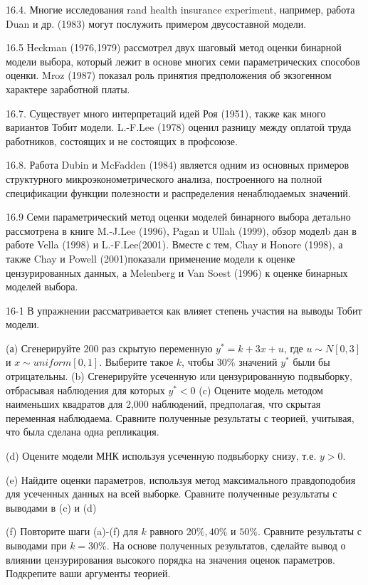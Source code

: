 16.4. Многие исследования rand health insurance experiment, например, работа Duan и др. (1983) могут послужить примером двусоставной модели.

16.5 Heckman (1976,1979) рассмотрел двух шаговый метод оценки бинарной модели выбора, который лежит в основе многих семи параметрических способов оценки. Mroz (1987) показал роль принятия предположения об экзогенном характере заработной платы.

16.7. Существует много интерпретаций идей Роя (1951), также как много вариантов Тобит модели. L.-F.Lee (1978) оценил разницу между оплатой труда работников, состоящих и не состоящих в профсоюзе.

16.8. Работа Dubin и McFadden (1984) является одним из основных примеров структурного микроэконометрического анализа, построенного на полной спецификации функции полезности и распределения ненаблюдаемых значений.

16.9 Семи параметрический метод оценки моделей бинарного выбора детально рассмотрена в книге M.-J.Lee (1996), Pagan и Ullah (1999), обзор моделb дан в работе Vella (1998) и L.-F.Lee(2001). Вместе с тем, Chay и Honore (1998), а также Chay и Powell (2001)показали применение модели к оценке цензурированных данных, а Melenberg и Van Soest (1996) к оценке бинарных моделей выбора. 

16-1 В упражнении рассматривается как влияет степень участия на выводы Тобит модели.

(а) Сгенерируйте 200 раз скрытую переменную $y^{*}=k+3x+u$, где $u{\sim}N[0,3]$ и $x{\sim}uniform[0,1]$. Выберите такое $k$, чтобы $30\%$ значений $y^{*}$ были бы отрицательны.
(b) Сгенерируйте усеченную или цензурированную подвыборку, отбрасывая наблюдения для которых $y^{*}<0$
(c) Оцените модель методом наименьших квадратов для 2,000 наблюдений, предполагая, что скрытая переменная наблюдаема. Сравните полученные результаты с теорией, учитывая, что была сделана одна репликация.

(d) Оцените модели МНК используя усеченную подвыборку снизу, т.е. $y>0$.

(e) Найдите оценки параметров, используя метод максимального правдоподобия для усеченных данных на всей выборке. Сравните полученные результаты с выводами в (c) и (d)

(f) Повторите шаги (a)-(f) для $k$ равного $20\%, 40\%$ и $50\%$. Сравните результаты с выводами при $k=30\%$. На основе полученных результатов, сделайте вывод о влиянии цензурирования высокого порядка на значения оценок параметров. Подкрепите ваши аргументы теорией.

